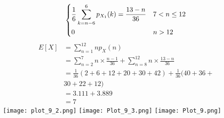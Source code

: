 \documentclass{article}
\begin{document}
\begin{multicols}{2}
\[\begin{dcases}
           \frac{1}{6}\sum_{k=n-6}^6 p_{X_1}(k)=\frac{13-n}{36} & 7 < n \leq 12 \\
           0 & n>12
           \end{dcases}\]
\begin{align}
    E[X]&=\sum_{n=1}^{12} n p_{X}(n) \nonumber \\
        &=\sum_{n=2}^7 n\times \frac{n-1}{36}+\sum_{n=8}^{12} n \times \frac{13-n}{36} \nonumber \\
        &=\frac{1}{36}(2+6+12+20+30+42)+\frac{1}{36}(40+36+ \nonumber \\
        &30+22+12) \nonumber \\
        &=3.111+3.889 \nonumber \\
        &=7 \nonumber
\end{align}
\texttt{[image: plot\_9\_2.png]}
\texttt{[image: Plot\_9\_3.png]}
\texttt{[image: Plot\_9.png]}



\end{multicols}
\end{document}

